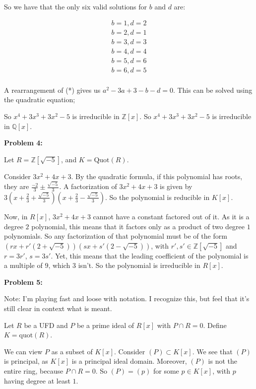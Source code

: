 \documentclass[a4paper,12pt]{article}
\newcommand{\shunt}{\vspace{20mm}}
\newcommand{\Q}{\mathbb{Q}}
\newcommand{\Z}{\mathbb{Z}}
\begin{document}
So we have that the only six valid solutions for $b$ and $d$ are:

\begin{align*}
b=1,d=2\\
b=2,d=1\\
b=3,d=3\\
b=4,d=4\\
b=5,d=6\\
b=6,d=5\\
\end{align*}

A rearrangement of (*) gives us $a^2-3a+3-b-d=0$. This can be solved using the quadratic equation;

So $x^4 + 3x^3 + 3x^2 -5$ is irreducible in $\Z[x]$. So $x^4 + 3x^3 + 3x^2 -5$ is irreducible in $\Q[x]$.

\shunt

{\bf Problem 4:} 

Let $R = \Z[\sqrt{-5}]$, and $K = \text{Quot}(R)$. 

Consider $3x^2 + 4x + 3$. By the quadratic formula, if this polynomial has roots, they are $\frac{-2}{3} \pm \frac{\sqrt{-5}}{3}$. A factorization of $3x^2 + 4x + 3$ is given by $3(x+\frac{2}{3} + \frac{\sqrt{-5}}{3})(x+\frac{2}{3} - \frac{\sqrt{-5}}{3})$. So the polynomial is reducible in $K[x]$.

Now, in $R[x]$, $3x^2 + 4x + 3$ cannot have a constant factored out of it. As it is a degree $2$ polynomial, this means that it factors only as a product of two degree $1$ polynomials. So any factorization of that polynomial must be of the form $(rx+r'(2 +\sqrt{-5}))(sx+s'(2 -\sqrt{-5}))$, with $r',s' \in \Z[\sqrt{-5}]$ and $r=3r'$, $s=3s'$. Yet, this means that the leading coefficient of the polynomial is a multiple of $9$, which $3$ isn't. So the polynomial is irreducible in $R[x]$.

\shunt

{\bf Problem 5:} 

Note: I'm playing fast and loose with notation. I recognize this, but feel that it's still clear in context what is meant.

Let $R$ be a UFD and $P$ be a prime ideal of $R[x]$ with $P \cap R =0$. Define $K = \text{quot}(R)$.

We can view $P$ as a subset of $K[x]$. Consider $(P) \subset K[x]$. We see that $(P)$ is principal, as $K[x]$ is a principal ideal domain. Moreover, $(P)$ is not the entire ring, because $P \cap R = 0$. So $(P) = (p)$ for some $p \in K[x]$, with $p$ having degree at least $1$. %
\end{document}
